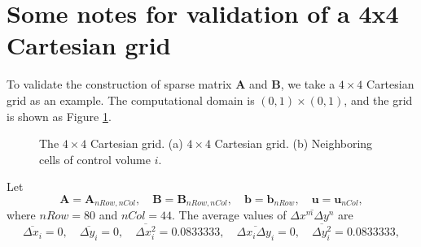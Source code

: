 \documentclass[review]{elsarticle}
\begin{document}
\section {Some notes for validation of a 4x4 Cartesian grid}
To validate the construction of sparse matrix $\bm{A}$ and $\bm{B}$, we take a $4 \times 4$ Cartesian grid as an example.
The computational domain is $(0, 1) \times (0,1)$, and the grid is shown as Figure \ref{fig:grid4x4}.  
\begin{figure}[!htp]
	\centering
	\caption{The $4 \times 4$ Cartesian grid. (a) $4 \times 4$ Cartesian grid. (b) Neighboring cells of control volume $i$.}
	\label{fig:grid4x4}
\end{figure}
Let
\begin{equation}\label{exLinearSys}
	\bm{A}=\bm{A}_{nRow,nCol}, \quad \bm{B}=\bm{B}_{nRow,nCol}, \quad \bm{b}=\bm{b}_{nRow}, \quad \bm{u}=\bm{u}_{nCol},
\end{equation}
where $nRow=80$ and $nCol=44$. The average values of $\overline{\Delta x^m\Delta y^n}$ are
\begin{equation}\label{eq:avgi}
	\overline{\Delta x_i} = 0, \quad \overline{\Delta y_i}=0, \quad \overline{\Delta x^2_i} = 0.0833333, 
	\quad \overline{\Delta x_i\Delta y_i} = 0, \quad \overline{\Delta y^2_i} = 0.0833333, 
\end{equation}
\end{document}
